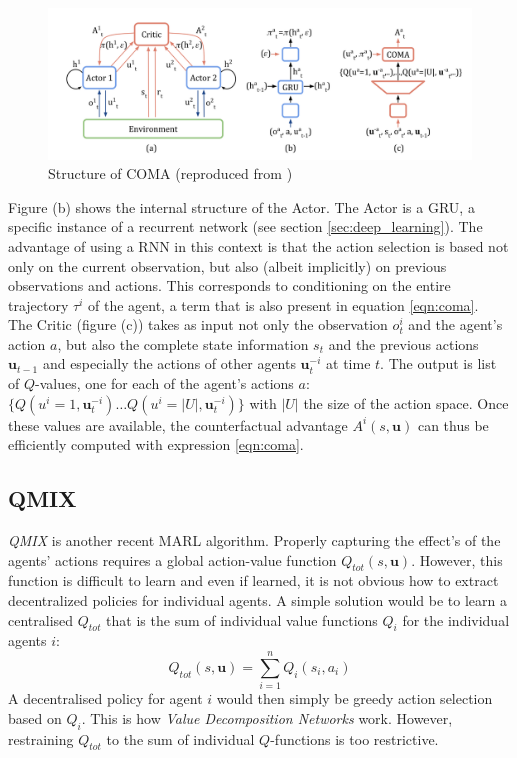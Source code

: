 \begin{figure}[htp]
    \centering
    \includegraphics[width=16cm]{images/coma_structure.png}
    \caption{Structure of COMA (reproduced from \cite{foerster2018counterfactual})}
    \label{fig:coma_structure}
\end{figure}

Figure (b) shows the internal structure of the Actor. The Actor is a GRU, a specific instance of a recurrent network (see section \ref{sec:deep_learning}). The advantage of using a RNN in this context is that the action selection is based not only on the current observation, but also (albeit implicitly) on previous observations and actions. This corresponds to conditioning on the entire trajectory $\tau^i$ of the agent, a term that is also present in equation \ref{eqn:coma}.\\

The Critic (figure (c)) takes as input not only the observation $o_t^i$ and the agent's action $a$, but also the complete state information $s_t$ and the previous actions $\bm{u}_{t-1}$ and especially the actions of other agents $\bm{u}_t^{-i}$ at time $t$. The output is list of $Q$-values, one for each of the agent's actions $a$: $\{Q(u^i=1, \bm{u}_t^{-i}) \ldots  Q(u^i=|U|, \bm{u}_t^{-i}) \}$ with $|U|$ the size of the action space. Once these values are available, the counterfactual advantage $A^i(s, \bm{u})$ can thus be efficiently computed with expression \ref{eqn:coma}.

\subsection{QMIX}
\label{sec:intro_qmix}

\emph{QMIX} \cite{rashid2018qmix} is another recent MARL algorithm. Properly capturing the effect's of the agents' actions requires a global action-value function $Q_{tot}(s, \bm{u})$. However,  this function is difficult to learn and even if learned, it is not obvious how to extract decentralized policies for individual agents. A simple solution would be to learn a centralised $Q_{tot}$ that is the sum of individual value functions $Q_i$ for the individual agents $i$:
\begin{equation}
    Q_{tot}(s, \bm{u}) = \sum_{i=1}^{n} Q_i(s_i, a_i)
\end{equation}
A decentralised policy for agent $i$ would then simply be greedy action selection based on $Q_i$. This is how \emph{Value Decomposition Networks} \cite{sunehag2018value} work. However, restraining $Q_{tot}$ to the sum of individual $Q$-functions is too restrictive.\\

